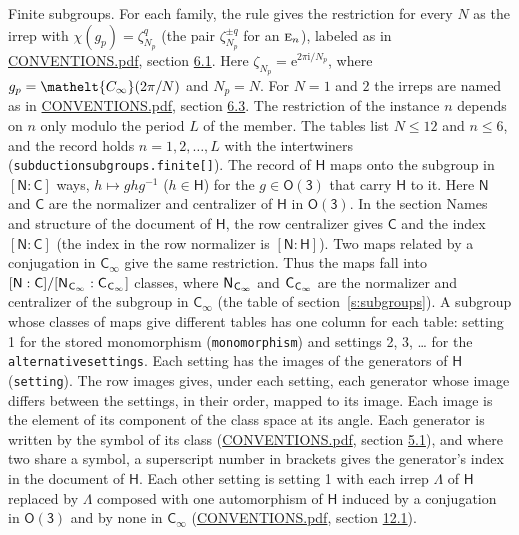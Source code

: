 \documentclass[10pt,a4paper]{article}
\makeatletter
\renewcommand\paragraph{\@startsection{paragraph}{4}{\z@}{1.5ex plus .5ex minus .2ex}{-1em}%
  {\normalfont\small\sffamily\bfseries\color{parttitle}}}
\numberwithin{equation}{section}
\newcommand{\eltfont}[1]{{\let\sigma\eltsigma\mathelt{#1}}}
\newcommand{\grp}[1]{\mathsf{#1}}
\newcommand{\irr}[1]{\text{\normalfont\scshape #1}}
\newcommand{\elt}[1]{\eltfont{#1}}
\newcommand{\grpindex}[2]{[#1 : #2]}
\newcommand{\iunit}{\mathrm{i}}
\newcommand{\expe}{\mathrm{e}}
\newcommand{\rootunity}[1]{\zeta_{#1}}
\newcommand{\period}{L}
\newcommand{\hairsp}{\mkern1mu}
\makeatother
\begin{document}
\paragraph{Finite subgroups.} \label{n:function.character.plain}\label{n:element.principal}\label{n:constant.root}\label{n:index.residue}\label{n:index.order.principal}For each family, the rule gives the restriction for every $N$ as the irrep with $\chi(g_p) = \rootunity{N_p}^{q}$ (the pair $\rootunity{N_p}^{\pm q}$ for an $\irr{e}_n$), labeled as in \href{../../CONVENTIONS.pdf}{CONVENTIONS.pdf}, section \href{../../CONVENTIONS.pdf\#conv.6.1}{6.1}. Here $\rootunity{N_p} = \expe^{2\pi\iunit/N_p}$, where $g_p = \elt{C_\infty}(2\pi/N)$ and $N_p = N$. For $N = 1$ and $2$ the irreps are named as in \href{../../CONVENTIONS.pdf}{CONVENTIONS.pdf}, section \href{../../CONVENTIONS.pdf\#conv.6.3}{6.3}. \label{n:index.period}The restriction of the instance $n$ depends on $n$ only modulo the period $\period$ of the member. The tables list $N \le 12$ and $n \le 6$, and the record holds $n = 1, 2, \dots, \period$ with the intertwiners (\texttt{subductionsubgroups.finite[]}). \label{n:group.normalizer.o3}\label{n:group.centralizer.o3}\label{n:element.h}The record of $\grp{H}$ maps onto the subgroup in $\grpindex{\grp{N}}{\grp{C}}$ ways, $h \mapsto g h g^{-1}$ ($h \in \grp{H}$) for the $g \in \grp{O(3)}$ that carry $\grp{H}$ to it. Here $\grp{N}$ and $\grp{C}$ are the normalizer and centralizer of $\grp{H}$ in \href{O3.pdf}{$\grp{O(3)}$}. In the section Names and structure of the document of $\grp{H}$, the row centralizer gives $\grp{C}$ and the index $\grpindex{\grp{N}}{\grp{C}}$ (the index in the row normalizer is $\grpindex{\grp{N}}{\grp{H}}$). Two maps related by a conjugation in $\grp{C_{\infty}}$ give the same restriction. Thus the maps fall into $\grpindex{\grp{N}}{\grp{C}}/\grpindex{\grp{N}_{\hairsp \grp{C_{\infty}}}}{\grp{C}_{\hairsp \grp{C_{\infty}}}}$ classes, where $\grp{N}_{\hairsp \grp{C_{\infty}}}$ and $\grp{C}_{\hairsp \grp{C_{\infty}}}$ are the normalizer and centralizer of the subgroup in $\grp{C_{\infty}}$ (the table of section~\ref{s:subgroups}). \label{n:head.setting}A subgroup whose classes of maps give different tables has one column for each table: setting 1 for the stored monomorphism (\texttt{monomorphism}) and settings 2, 3, \dots{} for the \texttt{alternativesettings}. Each setting has the images of the generators of $\grp{H}$ (\texttt{setting}). \label{n:head.images}The row images gives, under each setting, each generator whose image differs between the settings, in their order, mapped to its image. Each image is the element of its component of the class space at its angle. Each generator is written by the symbol of its class (\href{../../CONVENTIONS.pdf}{CONVENTIONS.pdf}, section \href{../../CONVENTIONS.pdf\#conv.5.1}{5.1}), and where two share a symbol, a superscript number in brackets gives the generator's index in the document of $\grp{H}$. \label{n:irrep.Delta}Each other setting is setting 1 with each irrep $\Lambda$ of $\grp{H}$ replaced by $\Lambda$ composed with one automorphism of $\grp{H}$ induced by a conjugation in \href{O3.pdf}{$\grp{O(3)}$} and by none in $\grp{C_{\infty}}$ (\href{../../CONVENTIONS.pdf}{CONVENTIONS.pdf}, section \href{../../CONVENTIONS.pdf\#conv.12.1}{12.1}).
\end{document}
